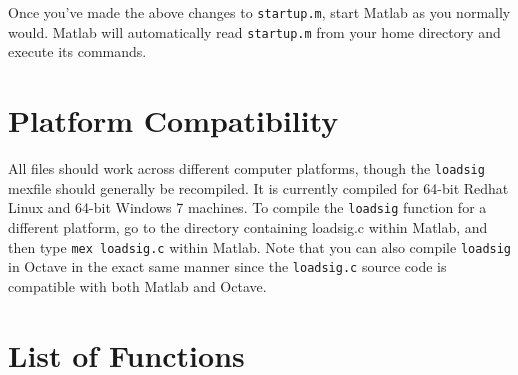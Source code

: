 \documentclass [dvips,12pt,cite]{article}
\begin{document}
Once you've made the above changes to \verb|startup.m|, start Matlab
as you normally would.  Matlab will automatically read \verb|startup.m|
from your home directory and execute its commands. 

\section*{Platform Compatibility}

All files should work across different computer platforms, though
the \verb|loadsig| mexfile should generally be recompiled.  It is 
currently compiled for 64-bit Redhat Linux and 64-bit Windows 7 machines.  
To compile the \verb|loadsig| function for a different
platform, go to the directory
containing loadsig.c within Matlab, and then type \verb|mex loadsig.c|
within Matlab.  Note that you can also compile \verb|loadsig| in Octave in the exact same manner since the \verb|loadsig.c| source code is compatible with both Matlab and Octave.

\section*{List of Functions}
\end{document}
